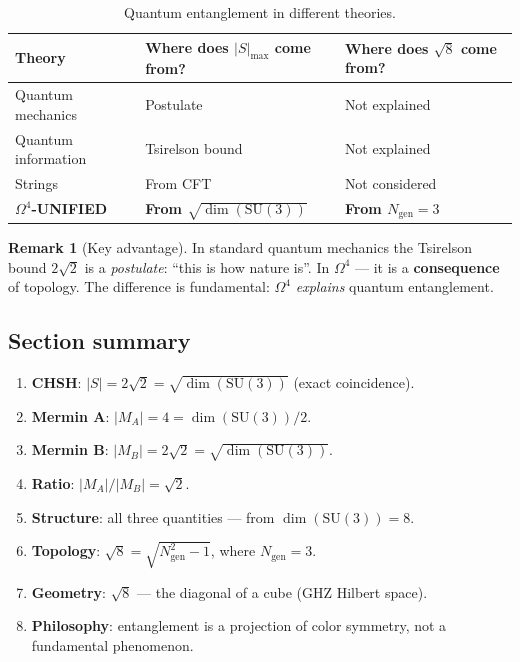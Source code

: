 \documentclass[11pt,a4paper]{article}
\newcommand{\SU}{\mathrm{SU}}
\newcommand{\Om}{\Omega^4}
\theoremstyle{definition}
\newtheorem{remark}[theorem]{Remark}
\begin{document}
\begin{table}[htbp]
\centering
\caption{Quantum entanglement in different theories.}
\label{tab:entanglement-comparison}
\begin{tabular}{p{3.5cm}p{5cm}p{5cm}}
\toprule
Theory & Where does $|S|_{\max}$ come from? & Where does $\sqrt{8}$ come from? \\
\midrule
Quantum mechanics & Postulate & Not explained \\[0.3em]
Quantum information & Tsirelson bound & Not explained \\[0.3em]
Strings & From CFT & Not considered \\[0.3em]
\textbf{$\Om$-UNIFIED} & 
    \textbf{From $\sqrt{\dim(\SU(3))}$} & 
    \textbf{From $N_{\text{gen}} = 3$} \\
\bottomrule
\end{tabular}
\end{table}

\begin{remark}[Key advantage]
\label{rem:entanglement-advantage}
In standard quantum mechanics the Tsirelson bound 
$2\sqrt{2}$ is a \emph{postulate}: ``this is how nature is''. 
In $\Om$ — it is a \textbf{consequence} of topology. The difference 
is fundamental: $\Om$ \emph{explains} quantum entanglement.
\end{remark}

\subsection{Section summary}
\label{subsec:entanglement-summary}

\begin{enumerate}
    \item \textbf{CHSH}: $|S| = 2\sqrt{2} = \sqrt{\dim(\SU(3))}$ 
          (exact coincidence).
    \item \textbf{Mermin A}: $|M_A| = 4 = \dim(\SU(3))/2$.
    \item \textbf{Mermin B}: $|M_B| = 2\sqrt{2} = \sqrt{\dim(\SU(3))}$.
    \item \textbf{Ratio}: $|M_A| / |M_B| = \sqrt{2}$.
    \item \textbf{Structure}: all three quantities — from 
          $\dim(\SU(3)) = 8$.
    \item \textbf{Topology}: $\sqrt{8} = \sqrt{N_{\text{gen}}^2 - 1}$, 
          where $N_{\text{gen}} = 3$.
    \item \textbf{Geometry}: $\sqrt{8}$ — the diagonal of a cube 
          (GHZ Hilbert space).
    \item \textbf{Philosophy}: entanglement is a projection of color 
          symmetry, not a fundamental phenomenon.
\end{enumerate}
\end{document}
